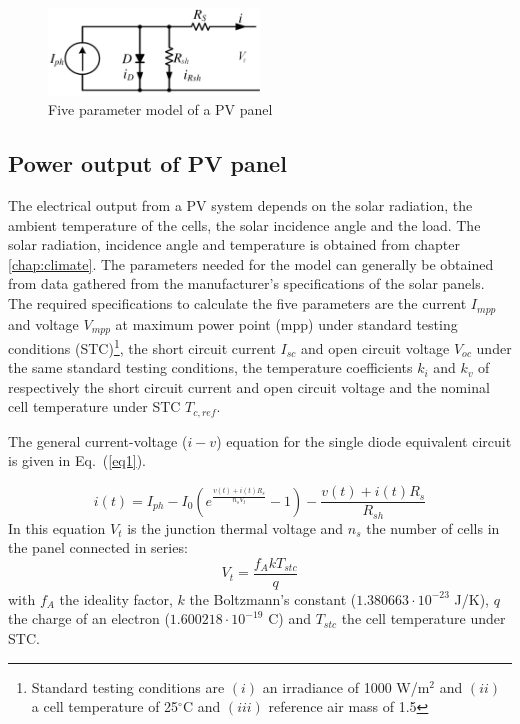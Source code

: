 \begin{figure}[ht]
\centerline{\includegraphics[width=0.5\textwidth]{Electric/MyGraphics/5param_eq.png}}
\label{fig:5param_equiv}
\caption{Five parameter model of a PV panel~\cite{desoto}} 
\end{figure}

\subsection{Power output of PV panel}
The electrical output from a PV system depends on the solar radiation, the ambient temperature of the cells, the solar incidence angle and the load. The solar radiation, incidence angle and temperature is obtained from chapter \ref{chap:climate}. The parameters needed for the model can generally be obtained from data gathered from the manufacturer's specifications of the solar panels. The required specifications to calculate the five parameters are the current $I_{mpp}$ and voltage $V_{mpp}$ at maximum power point (mpp) under standard testing conditions (STC)\footnote{Standard testing conditions are $(i)$ an irradiance of 1000 W/m$^2$ and $(ii)$ a cell temperature of 25$^\circ$C and $(iii)$ reference air mass of 1.5}, the short circuit current $I_{sc}$ and open circuit voltage $V_{oc}$ under the same standard testing conditions, the temperature coefficients $k_{i}$ and $k_{v}$ of respectively the short circuit current and open circuit voltage and the nominal cell temperature under STC $T_{c,ref}$.

The general current-voltage ($i-v$) equation for the single diode equivalent circuit is given in Eq.~(\ref{eq1}). 

\begin{equation}
i(t) = I_{ph} - I_{0} \left(e^{\frac{v(t) + i(t)R_{s}}{n_{s} V_{t}}} - 1 \right) - \frac{v(t) + i(t)R_{s}}{R_{sh}}
\label{eq1}
\end{equation}
In this equation $V_{t}$ is the junction thermal voltage and $n_{s}$ the number of cells in the panel connected in series:
\begin{equation}
V_t = \frac{f_{A} k T_{stc}}{q}
\label{eqVt}
\end{equation}
with $f_A$ the ideality factor, $k$ the Boltzmann's constant ($1.380663 \cdot 10^{-23}$ J/K), $q$ the charge of an electron ($1.600218 \cdot 10^{-19}$ C) and $T_{stc}$ the cell temperature under STC.

